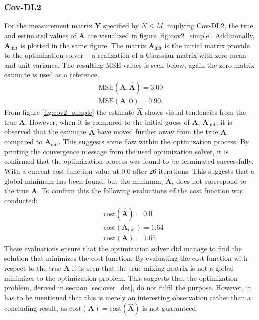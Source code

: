 \subsubsection{Cov-DL2}
For the measurement matrix $\mathbf{Y}$ specified by $N \leq \widetilde{M}$, implying Cov-DL2, the true and estimated values of $\mathbf{A}$ are visualized in figure \ref{fig:cov2_simple}. 
Additionally, $\mathbf{A}_{\text{init}}$ is plotted in the same figure. 
The matrix $\mathbf{A}_{\text{init}}$ is the initial matrix provide to the optimization solver -- a realization of a Gaussian matrix with zero mean and unit variance. 
The resulting MSE values is seen below, again the zero matrix estimate is used as a reference. 
\begin{align*}
\text{MSE}(\mathbf{A}, \hat{\mathbf{A}}) = 3.00 \\
\text{MSE}(\mathbf{A}, \mathbf{0}) = 0.90.
\end{align*}
From figure \ref{fig:cov2_simple} the estimate $\hat{\mathbf{A}}$ shows visual tendencies from the true $\mathbf{A}$. 
However, when it is compared to the initial guess of $\mathbf{A}$, $\mathbf{A}_{\text{init}}$, it is observed that the estimate $\hat{\mathbf{A}}$ have moved further away from the true $\mathbf{A}$ compared to $\mathbf{A}_{\text{init}}$. 
This suggests some flaw within the optimization process. 
By printing the convergence message from the used optimization solver, it is confirmed that the optimization process was found to be terminated successfully. 
With a current cost function value at $0.0$ after 26 iterations. 
This suggests that a global minimum has been found, but the minimum, $\hat{\mathbf{A}}$, does not correspond to the true $\mathbf{A}$. 
To confirm this the following evaluations of the cost function was conducted: 
\begin{align*}
&\text{cost}(\hat{\mathbf{A}}) = 0.0\\
&\text{cost}(\mathbf{A}_{\text{init}}) = 1.64\\
&\text{cost}(\mathbf{A}) = 1.65
\end{align*}
These evaluations ensure that the optimization solver did manage to find the solution that minimizes the cost function. 
By evaluating the cost function with respect to the true $\mathbf{A}$ it is seen that the true mixing matrix is not a global minimizer to the optimization problem. 
This suggests that the optimization problem, derived in section \ref{sec:over_det}, do not fulfil the purpose.
However, it has to be mentioned that this is merely an interesting observation rather than a concluding result, as $\text{cost}(\mathbf{A}) = \text{cost}(\hat{\mathbf{A}})$ is not guaranteed. 
